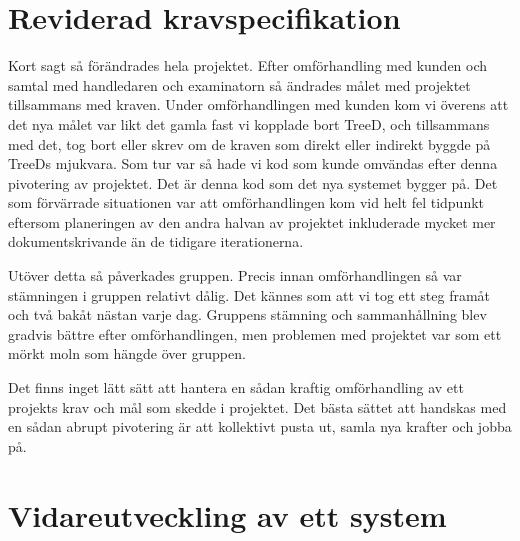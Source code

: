 \section{Reviderad kravspecifikation}
Kort sagt så förändrades hela projektet. Efter omförhandling med kunden och samtal med handledaren och examinatorn så ändrades målet med projektet tillsammans med kraven. Under omförhandlingen med kunden kom vi överens att det nya målet var likt det gamla fast vi kopplade bort TreeD, och tillsammans med det, tog bort eller skrev om de kraven som direkt eller indirekt byggde på TreeDs mjukvara. Som tur var så hade vi kod som kunde omvändas efter denna pivotering  
av projektet. Det är denna kod som det nya systemet bygger på. Det som förvärrade situationen var att omförhandlingen kom vid helt fel tidpunkt eftersom planeringen av den andra halvan av projektet inkluderade mycket mer dokumentskrivande än de tidigare iterationerna.

Utöver detta så påverkades gruppen. Precis innan omförhandlingen så var stämningen i gruppen relativt dålig. Det kännes som att vi tog ett steg framåt och två bakåt nästan varje dag. Gruppens stämning och sammanhållning blev gradvis bättre efter omförhandlingen, men problemen med projektet var som ett mörkt moln som hängde över gruppen.

Det finns inget lätt sätt att hantera en sådan kraftig omförhandling av ett projekts krav och mål som skedde i projektet. Det bästa sättet att handskas med en sådan abrupt pivotering är att kollektivt pusta ut, samla nya krafter och jobba på.  
\section{Vidareutveckling av ett system}



